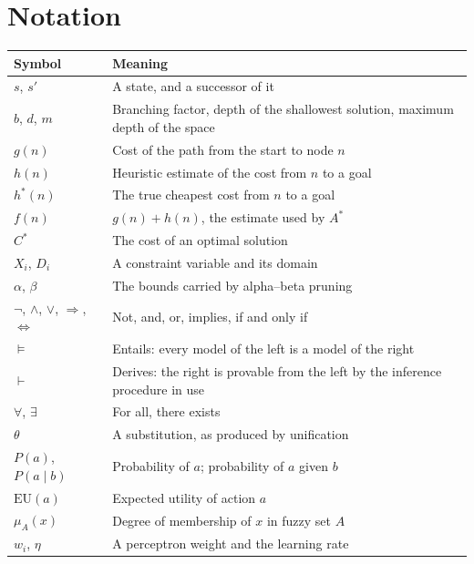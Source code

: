 \newpage

\chapter*{Notation}

\begin{longtable}{@{}L{2.8cm}L{12.4cm}@{}}
\toprule
{}
\textbf{Symbol} & \textbf{Meaning} \\
\midrule
\endhead
$s$, $s'$ & A state, and a successor of it \\
$b$, $d$, $m$ & Branching factor, depth of the shallowest solution, maximum depth
of the space \\
$g(n)$ & Cost of the path from the start to node $n$ \\
$h(n)$ & Heuristic estimate of the cost from $n$ to a goal \\
$h^{*}(n)$ & The true cheapest cost from $n$ to a goal \\
$f(n)$ & $g(n) + h(n)$, the estimate used by $A^{*}$ \\
$C^{*}$ & The cost of an optimal solution \\
$X_{i}$, $D_{i}$ & A constraint variable and its domain \\
$\alpha$, $\beta$ & The bounds carried by alpha--beta pruning \\
$\neg$, $\wedge$, $\vee$, $\Rightarrow$, $\Leftrightarrow$ & Not, and, or,
implies, if and only if \\
$\models$ & Entails: every model of the left is a model of the right \\
$\vdash$ & Derives: the right is provable from the left by the inference
procedure in use \\
$\forall$, $\exists$ & For all, there exists \\
$\theta$ & A substitution, as produced by unification \\
$P(a)$, $P(a \mid b)$ & Probability of $a$; probability of $a$ given $b$ \\
$\mathrm{EU}(a)$ & Expected utility of action $a$ \\
$\mu_{A}(x)$ & Degree of membership of $x$ in fuzzy set $A$ \\
$w_{i}$, $\eta$ & A perceptron weight and the learning rate \\
\bottomrule
\end{longtable}

